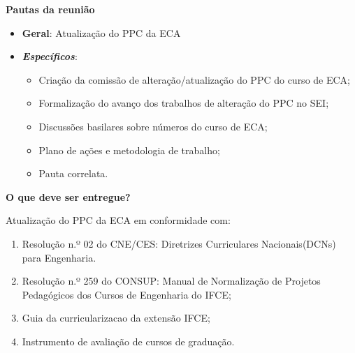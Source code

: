 \begin{frame}{\bf Pautas da reunião}
\begin{itemize}
\justifying
\item \textbf{Geral}: Atualização do PPC da ECA
\item \textit{\textbf{Específicos}}:
\begin{itemize}
	\justifying
	\item Criação da comissão de alteração/atualização do PPC do curso de ECA;
	\item Formalização do avanço dos trabalhos de alteração do PPC no SEI;
	\item Discussões basilares sobre números do curso de ECA;
	\item Plano de ações e metodologia de trabalho;
	\item Pauta correlata.
\end{itemize}


\end{itemize}

\end{frame}
\begin{frame}{\bf O que deve ser entregue?}

Atualização do PPC da ECA em conformidade com:\\

\begin{enumerate}
\justifying
\item Resolução n.º 02 do CNE/CES: Diretrizes Curriculares Nacionais(DCNs) para Engenharia.
\vspace{0.5cm}
\item Resolução n.º 259 do CONSUP: Manual de Normalização de Projetos
Pedagógicos dos Cursos de Engenharia do IFCE;
\vspace{0.5cm}
\item Guia da curricularizacao da extensão IFCE;
\vspace{0.5cm}
\item Instrumento de avaliação de cursos de graduação.

\end{enumerate}

\end{frame}
